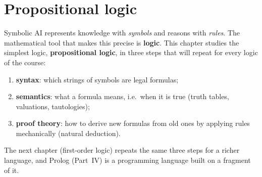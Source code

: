 \section{Propositional logic}
\label{sec:propositional-logic}

Symbolic AI represents knowledge with \emph{symbols} and reasons with \emph{rules}. The
mathematical tool that makes this precise is \textbf{logic}. This chapter studies the
simplest logic, \textbf{propositional logic}, in three steps that will repeat for every
logic of the course:
\begin{enumerate}[nosep]
  \item \textbf{syntax}: which strings of symbols are legal formulas;
  \item \textbf{semantics}: what a formula means, i.e.\ when it is true (truth tables,
        valuations, tautologies);
  \item \textbf{proof theory}: how to derive new formulas from old ones by applying rules
        mechanically (natural deduction).
\end{enumerate}
The next chapter (first-order logic) repeats the same three steps for a richer language,
and Prolog (Part~IV) is a programming language built on a fragment of it.






